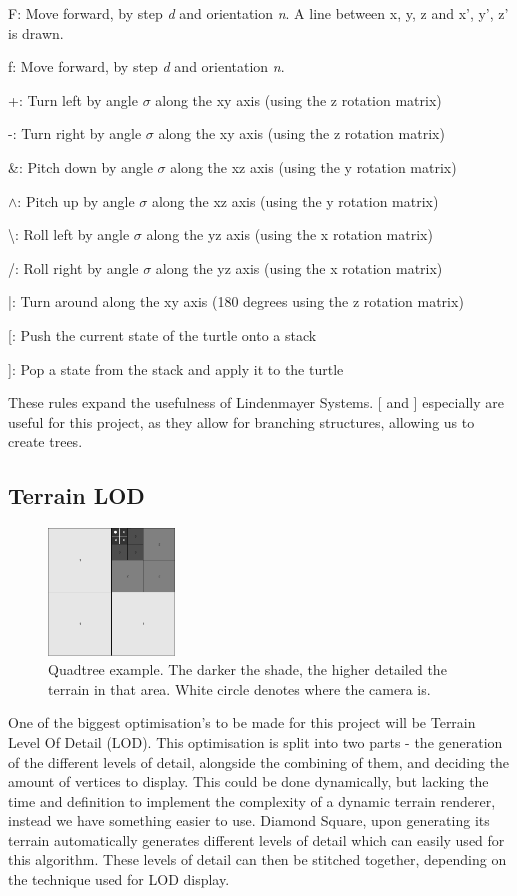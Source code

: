 \documentclass[a4paper,10pt]{report}
\begin{document}
F: Move forward, by step \textit{d} and orientation \textit{n}. A line between {x, y, z} and {x', y', z'} is drawn.

f: Move forward, by step \textit{d} and orientation \textit{n}. 

+: Turn left by angle $\sigma$ along the xy axis (using the z rotation matrix)

-: Turn right by angle $\sigma$ along the xy axis (using the z rotation matrix)

\&: Pitch down by angle $\sigma$ along the xz axis (using the y rotation matrix)

$\wedge$: Pitch up by angle $\sigma$ along the xz axis (using the y rotation matrix)

\textbackslash: Roll left by angle $\sigma$ along the yz axis (using the x rotation matrix)

/: Roll right by angle $\sigma$ along the yz axis (using the x rotation matrix)

|: Turn around along the xy axis (180 degrees using the z rotation matrix)

[: Push the current state of the turtle onto a stack

]: Pop a state from the stack and apply it to the turtle\medskip

These rules expand the usefulness of Lindenmayer Systems. [ and ] especially are useful for this project, as they allow for branching structures, allowing us to create trees.

\clearpage
\subsection{Terrain LOD}

\begin{figure}[h!]
    \centering
  \includegraphics[width=0.3\textwidth]{QuadTree.png}
 \caption{Quadtree example. The darker the shade, the higher detailed the terrain in that area. White circle denotes where the camera is.}
 \label{fig:quad_tree}
\end{figure}

One of the biggest optimisation's to be made for this project will be Terrain Level Of Detail (LOD). This optimisation is split into two parts - the generation of the different levels of detail, alongside the combining of them, and deciding the amount of vertices to display. This could be done dynamically, but lacking the time and definition  to implement the complexity of a dynamic terrain renderer, instead we have something easier to use. Diamond Square, upon generating its terrain automatically generates different levels of detail which can easily used for this algorithm. These levels of detail can then be stitched together, depending on the technique used for LOD display. \medskip
\end{document}
